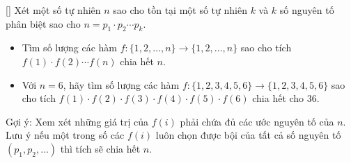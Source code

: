 \documentclass[../01-divisibility.tex]{subfiles}
\begin{document}
\begin{exercise*}\label{example:ROU-2015-MO-G10-P2}[\textbf{}]
    Xét một số tự nhiên \( n \) sao cho tồn tại một số tự nhiên \( k \) và \( k \) số nguyên tố phân biệt sao cho \( n = p_1 \cdot p_2 \cdots p_k \).
    \begin{itemize}[topsep=0pt, partopsep=0pt, itemsep=0pt]
        \item Tìm số lượng các hàm \( f : \{1, 2, \ldots, n\} \longrightarrow \{1, 2, \ldots, n\} \) sao cho tích \( f(1) \cdot f(2) \cdots f(n) \) chia hết \( n \).
        \item Với \( n = 6 \), hãy tìm số lượng các hàm \( f : \{1, 2, 3, 4, 5, 6\} \longrightarrow \{1, 2, 3, 4, 5, 6\} \)
        sao cho tích \( f(1)\cdot f(2)\cdot f(3)\cdot f(4)\cdot f(5)\cdot f(6) \) chia hết cho \( 36 \).
    \end{itemize}
\end{exercise*}

\begin{remark*}
    Gợi ý: Xem xét những giá trị của \(f(i)\) phải chứa đủ các ước nguyên tố của \(n\).
    Lưu ý nếu một trong số các \(f(i)\) luôn chọn được bội của tất cả số nguyên tố \((p_1, p_2, \dots)\) thì tích sẽ chia hết \(n\).
\end{remark*}

\end{document}
